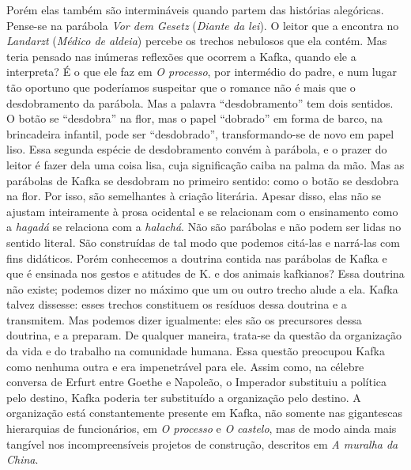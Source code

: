Porém elas também são intermináveis quando partem das histórias
alegóricas. Pense-se na parábola \textit{Vor dem Gesetz} (\textit{Diante da lei}). O
leitor que a encontra no \textit{Landarzt} (\textit{Médico de aldeia}) percebe os
trechos nebulosos que ela contém. Mas teria pensado nas inúmeras
reflexões que ocorrem a Kafka, quando ele a interpreta? É o que ele faz
em \textit{O processo}, por intermédio do padre, e num lugar tão oportuno que
poderíamos suspeitar que o romance não é mais que o desdobramento da
parábola. Mas a palavra ``desdobramento'' tem dois sentidos. O botão se
``desdobra'' na flor, mas o papel ``dobrado'' em forma de barco, na
brincadeira infantil, pode ser ``desdobrado'', transformando-se de novo
em papel liso. Essa segunda espécie de desdobramento convém à parábola,
e o prazer do leitor é fazer dela uma coisa lisa, cuja significação
caiba na palma da mão. Mas as parábolas de Kafka se desdobram no
primeiro sentido: como o botão se desdobra na flor. Por isso, são
semelhantes à criação literária. Apesar disso, elas não se ajustam
inteiramente à prosa ocidental e se relacionam com o ensinamento como a
\textit{hagadá} se relaciona com a \textit{halachá}. Não são parábolas e não podem
ser lidas no sentido literal. São construídas de tal modo que podemos
citá-las e narrá-las com fins didáticos. Porém conhecemos a doutrina
contida nas parábolas de Kafka e que é ensinada nos gestos e atitudes de
K. e dos animais kafkianos? Essa doutrina não existe; podemos dizer no
máximo que um ou outro trecho alude a ela. Kafka talvez dissesse: esses
trechos constituem os resíduos dessa doutrina e a transmitem. Mas
podemos dizer igualmente: eles são os precursores dessa doutrina, e a
preparam. De qualquer maneira, trata-se da questão da organização da
vida e do trabalho na comunidade humana. Essa questão preocupou Kafka
como nenhuma outra e era impenetrável para ele. Assim como, na célebre
conversa de Erfurt entre Goethe e Napoleão, o Imperador substituiu a
política pelo destino, Kafka poderia ter substituído a organização pelo
destino. A organização está constantemente presente em Kafka, não
somente nas gigantescas hierarquias de funcionários, em \textit{O processo} e
\textit{O castelo}, mas de modo ainda mais tangível nos incompreensíveis
projetos de construção, descritos em \textit{A muralha da China}.

